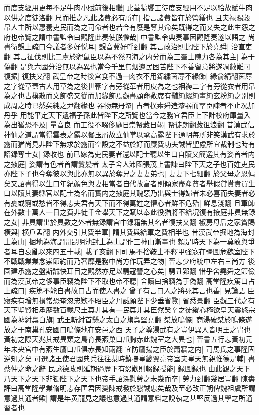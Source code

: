 而度支經用更每不足牛肉小賦前後相繼|{
	此蓋犒饗工徒度支經用不足以給故賦牛肉以供之度徒洛翻}
尺而推之凡此諸費必有所在|{
	指言諸費皆在於營繕也}
且夫禄賜穀帛人主所以惠養吏民而為之司命者也若今有廢是奪其命矣既得之而又失之此生怨之府也帝覽之謂中書監令曰觀隆此奏使朕懼哉|{
	中書監令典奏事因觀隆奏遂以語之}
尚書衛覬上疏曰今議者多好悦耳|{
	覬音冀好呼到翻}
其言政治則比陛下於堯舜|{
	治直吏翻}
其言征伐則比二虜於貍鼠臣以為不然四海之内分而為三羣士陳力各為其主|{
	為于偽翻}
是與六國分治無以為異也當今千里無烟遺民困苦陛下不善留意將遂凋敝難可復振|{
	復扶又翻}
武皇帝之時後宫食不過一肉衣不用錦繡茵蓐不緣飾|{
	緣俞絹翻茵蓐之字從草蓋古人用草為之後世鞇字有旁從革者用皮為之也裀褥二字有旁從衣者用帛為之也古樸散而文飾盛又從而加緣飾焉觀書顧命敷席有黼純綴純畫純玄粉純之别則成周之時已然矣純之尹翻緣也}
器物無丹漆|{
	古者樸素舜造漆器而羣臣諫者不止况加丹乎}
用能平定天下遺福子孫此皆陛下之所覽也當今之務宜君臣上下計校府庫量入為出猶恐不及|{
	量音良}
而工役不輟侈靡日崇帑藏日竭|{
	帑徒朗翻藏徂浪翻}
昔漢武信神仙之道謂當得雲表之露以餐玉屑故立仙掌以承高露陛下通明每所非笑漢武有求於露而猶尚見非陛下無求於露而空設之不益於好而糜費功夫誠皆聖慮所宜裁制也時有詔録奪士女|{
	録收也}
前已嫁為吏民妻者還以配士聽以生口自贖又簡選其有姿首者内之掖庭|{
	姿謂有色者首謂鬒髪者}
太子舍人沛國張茂上書諫曰陛下天之子也百姓吏民亦陛下子也今奪彼以與此亦無以異於奪兄之妻妻弟也|{
	妻妻下七細翻}
於父母之恩偏矣又詔書得以生口年紀顔色與妻相當者自代故富者則傾家盡產貧者舉假貸貰貴買生口以贖其妻縣官以配士為名而實内之掖庭其醜惡乃出與士得婦者未必喜而失妻者必有憂或窮或愁皆不得志夫君有天下而不得萬姓之懽心者鮮不危殆|{
	鮮息淺翻}
且軍師在外數十萬人一日之費非徒千金舉天下之賦以奉此役猶將不給况復有掖庭非員無録之女|{
	非員謂出於員數之外者無録謂宫中録籍無其名者復扶又翻}
椒房母后之家賞賜橫與|{
	横戶孟翻}
内外交引其費半軍|{
	謂其費與給軍之費相半也}
昔漢武帝掘地為海封土為山|{
	掘地為海謂開昆明池封土為山謂作三神山漸臺也}
賴是時天下為一莫敢與爭者耳自衰亂以來四五十載|{
	載子亥翻下同}
馬不捨鞍士不釋甲強寇在疆圖危魏室陛下不戰戰業業念崇節約而乃奢靡是務中尚方作玩弄之物|{
	晉志少府統中左右三尚方}
後園建承露之盤斯誠快耳目之觀然亦足以騁寇讐之心矣|{
	騁丑郢翻}
惜乎舍堯舜之節儉而為漢武帝之侈事臣竊為陛下不取也帝不聽|{
	舍讀曰捨竊為于偽翻}
高堂隆疾篤口占上疏曰|{
	疾篤不能自書故口占而使人書之}
曾子有言曰人之將死其言也善|{
	見論語}
臣寢疾有增無損常恐奄忽忠欵不昭臣之丹誠願陛下少垂省覽|{
	省悉景翻}
臣觀三代之有天下聖賢相承歷數百載尺土莫非其有一民莫非其臣然癸辛之徒縱心極欲皇天震怒宗國為墟紂梟白旗|{
	武王斬紂首懸之太白之旗梟堅堯翻}
桀放鳴條|{
	商湯破桀於鳴條遂放之于南巢孔安國曰鳴條地在安邑之西}
天子之尊湯武有之豈伊異人皆明王之胄也黃初之際天兆其戒異類之鳥育長燕巢口爪胸赤此魏室之大異也|{
	晉書五行志黃初元年未央宫中有燕生鷹口爪俱赤長知兩翻}
宜防鷹揚之臣於蕭牆之内|{
	司馬氏之事隆固逆知之矣}
可選諸王使君國典兵往往棊時鎮撫皇畿翼亮帝室夫皇天無親惟德是輔|{
	書蔡仲之命之辭}
民詠德政則延期過歷下有怨歎則輟録授能|{
	録圖録也}
由此觀之天下乃天下之天下非獨陛下之天下也帝手詔深慰勞之未幾而卒|{
	勞力到翻幾居豈翻}
陳夀評曰高堂隆學業脩明志存匡君因變陳戒發於懇誠忠矣哉及至必改正朔俾魏祖虞所謂意過其通者歟|{
	謂是年黄龍見之議也意過其通謂意料之說執之甚堅反過其學之所通習者也}


